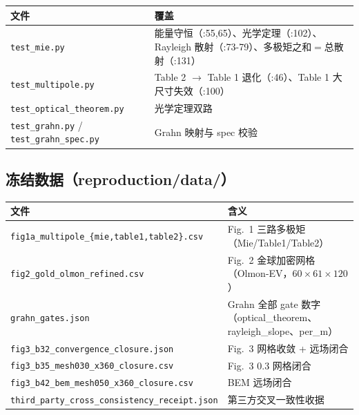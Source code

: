 \begin{longtable}{p{5.2cm}p{7.6cm}}
\toprule
文件 & 覆盖 \\
\midrule
\endhead
\texttt{test\_mie.py} & 能量守恒（:55,65）、光学定理（:102）、Rayleigh 散射（:73-79）、多极矩之和$=$总散射（:131） \\
\texttt{test\_multipole.py} & Table 2 $\to$ Table 1 退化（:46）、Table 1 大尺寸失效（:100） \\
\texttt{test\_optical\_theorem.py} & 光学定理双路 \\
\texttt{test\_grahn.py} / \texttt{test\_grahn\_spec.py} & Grahn 映射与 spec 校验 \\
\bottomrule
\end{longtable}

\subsection{冻结数据（reproduction/data/）}

\begin{longtable}{p{6.0cm}p{6.8cm}}
\toprule
文件 & 含义 \\
\midrule
\endhead
\texttt{fig1a\_multipole\_\{mie,table1,table2\}.csv} & Fig.~1 三路多极矩（Mie/Table1/Table2） \\
\texttt{fig2\_gold\_olmon\_refined.csv} & Fig.~2 金球加密网格（Olmon-EV，$60\times61\times120$） \\
\texttt{grahn\_gates.json} & Grahn 全部 gate 数字（optical\_theorem、rayleigh\_slope、per\_m） \\
\texttt{fig3\_b32\_convergence\_closure.json} & Fig.~3 网格收敛 + 远场闭合 \\
\texttt{fig3\_b35\_mesh030\_x360\_closure.csv} & Fig.~3 0.3 网格闭合 \\
\texttt{fig3\_b42\_bem\_mesh050\_x360\_closure.csv} & BEM 远场闭合 \\
\texttt{third\_party\_cross\_consistency\_receipt.json} & 第三方交叉一致性收据 \\
\bottomrule
\end{longtable}
